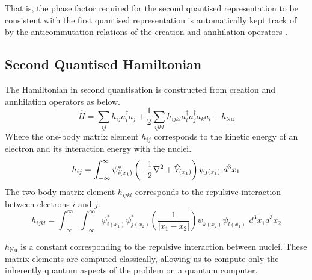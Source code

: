 That is, the phase factor required for the second quantised representation to be consistent with the first quantised representation is automatically kept track of by the anticommutation relations of the creation and annhilation operators \cite{Helgaker2000}.

\subsection{Second Quantised Hamiltonian}
The Hamiltonian in second quantisation is constructed from creation and annhilation operators as below.
\begin{equation*}
    \hat H =
    \sum_{ij} h_{ij} a^\dagger_i a_j +
    \frac{1}{2} \sum_{ijkl} h_{ijkl} a^\dagger_i a^\dagger_j a_k a_l +
    h_\text{Nu}
\end{equation*}
Where the one-body matrix element $h_{ij}$ corresponds to the kinetic energy of an electron and its interaction energy with the nuclei.
\begin{equation*}
h_{ij} = \int^\infty_{-\infty} \psi^*_{i(x_1)} \left( - \frac{1}{2} \nabla^2 + \hat V_{(x_1)} \right) \psi_{j(x_1)} \,\, d^3 x_1 \\
\end{equation*}
The two-body matrix element $h_{ijkl}$ corresponds to the repulsive interaction between electrons $i$ and $j$.
\begin{equation*}
h_{ijkl} = \int^\infty_{-\infty} \int^\infty_{-\infty} \psi^*_{i(x_1)} \psi^*_{j(x_2)} \left( \frac{1}{|x_1 - x_2|} \right) \psi_{k(x_2)} \psi_{l(x_1)} \,\, d^3 x_1 d^3 x_2
\end{equation*}

$h_\text{Nu}$ is a constant corresponding to the repulsive interaction between nuclei. These matrix elements are computed classically, allowing us to compute only the inherently quantum aspects of the problem on a quantum computer.


